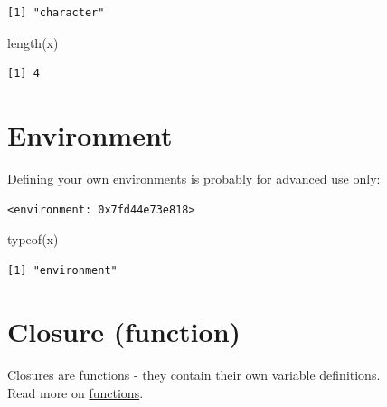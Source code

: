 \documentclass[
]{book}
\newenvironment{Shaded}{\begin{snugshade}}{\end{snugshade}}
\newcommand{\DecValTok}[1]{\textcolor[rgb]{0.00,0.00,0.81}{#1}}
\newcommand{\FunctionTok}[1]{\textcolor[rgb]{0.00,0.00,0.00}{#1}}
\newcommand{\NormalTok}[1]{#1}
\newcommand{\OtherTok}[1]{\textcolor[rgb]{0.56,0.35,0.01}{#1}}
\newcommand{\SpecialCharTok}[1]{\textcolor[rgb]{0.00,0.00,0.00}{#1}}
\newcommand{\StringTok}[1]{\textcolor[rgb]{0.31,0.60,0.02}{#1}}
\begin{document}
\begin{verbatim}
[1] "character"
\end{verbatim}

\begin{Shaded}
\begin{Highlighting}[]
\FunctionTok{length}\NormalTok{(x)}
\end{Highlighting}
\end{Shaded}

\begin{verbatim}
[1] 4
\end{verbatim}

\hypertarget{environment}{%
\section{Environment}\label{environment}}

Defining your own environments is probably for advanced use only:

\begin{Shaded}
\end{Shaded}

\begin{verbatim}
<environment: 0x7fd44e73e818>
\end{verbatim}

\begin{Shaded}
\begin{Highlighting}[]
\FunctionTok{typeof}\NormalTok{(x)}
\end{Highlighting}
\end{Shaded}

\begin{verbatim}
[1] "environment"
\end{verbatim}

\hypertarget{closure-function}{%
\section{Closure (function)}\label{closure-function}}

Closures are functions - they contain their own variable definitions.\\
Read more on \protect\hyperlink{functions}{functions}.
\end{document}
